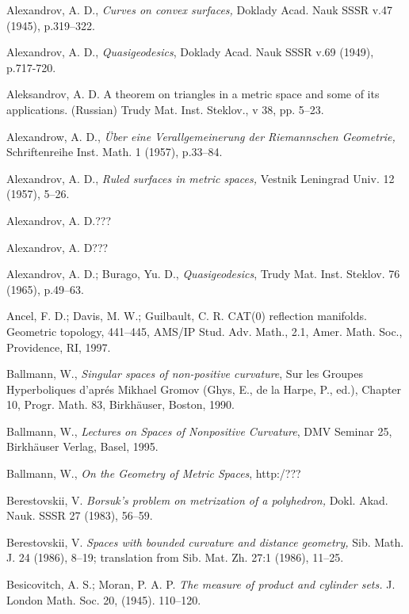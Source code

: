 \begin{thebibliography}{52}
 Alexandrov, A. D., \textit{Curves on convex surfaces,} Doklady Acad. Nauk SSSR v.47 (1945), p.319--322.

 Alexandrov, A. D., \textit{Quasigeodesics}, Doklady Acad. Nauk SSSR v.69 (1949),
p.717-720.

 Aleksandrov, A. D.
A theorem on triangles in a metric space and some of its applications. (Russian) Trudy Mat. Inst. Steklov., v 38, pp. 5--23.


 Alexandrow, A. D.,  \textit{\"Uber eine Verallgemeinerung der Riemannschen Geometrie,}
Schriftenreihe Inst. Math. 1 (1957), p.33--84.

 Alexandrov, A. D., \textit{Ruled surfaces in metric spaces,}
Vestnik Leningrad Univ. 12  (1957), 5--26.

 Alexandrov, A. D.???

 Alexandrov, A. D???

 Alexandrov, A. D.; Burago, Yu. D., \textit{Quasigeodesics}, Trudy Mat. Inst. Steklov.
76 (1965), p.49--63.

Ancel, F. D.; Davis, M. W.; Guilbault, C. R.
CAT(0) reflection manifolds. Geometric topology, 441--445,
AMS/IP Stud. Adv. Math., 2.1, Amer. Math. Soc., Providence, RI, 1997.

Ballmann, W., \textit{Singular spaces of non-positive curvature}, Sur les Groupes Hyperboliques d'apr\'{e}s Mikhael Gromov (Ghys, E., de la Harpe, P., ed.), Chapter 10, Progr. Math. 83, Birkh\"auser, Boston, 1990. 


Ballmann, W., \textit{Lectures on Spaces of Nonpositive Curvature}, DMV Seminar 25, Birkh\"auser Verlag, Basel, 1995. 

Ballmann, W., \textit{On the Geometry of Metric Spaces}, http:/???

 Berestovskii, V. 
\textit{Borsuk's problem on metrization of a polyhedron,}  
Dokl. Akad. Nauk. SSSR 27 (1983), 56--59.

 Berestovskii, V. 
\textit{Spaces with bounded curvature and distance geometry,}  
Sib. Math. J. 24 (1986), 8--19;
translation from Sib. Mat. Zh. 27:1 (1986), 11--25.

Besicovitch, A. S.; Moran, P. A. P.
\textit{The measure of product and cylinder sets.}
J. London Math. Soc. 20, (1945). 110--120. 


\end{thebibliography}

